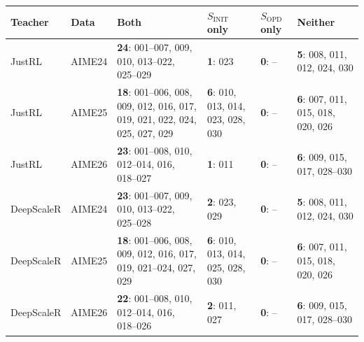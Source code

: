 \begin{center}
\label{tab:appendix_coverage_sets}
\centering
\scriptsize
\setlength{\tabcolsep}{2.2pt}
\begin{tabular}{llp{}p{}p{}p{}}
\toprule
Teacher & Data & Both & $S_{\mathrm{INIT}}$ only & $S_{\mathrm{OPD}}$ only & Neither \\
\midrule
JustRL & AIME24
& \textbf{24}: 001--007, 009, 010, 013--022, 025--029
& \textbf{1}: 023 & \textbf{0}: --
& \textbf{5}: 008, 011, 012, 024, 030 \\
JustRL & AIME25
& \textbf{18}: 001--006, 008, 009, 012, 016, 017, 019, 021, 022, 024, 025, 027, 029
& \textbf{6}: 010, 013, 014, 023, 028, 030 & \textbf{0}: --
& \textbf{6}: 007, 011, 015, 018, 020, 026 \\
JustRL & AIME26
& \textbf{23}: 001--008, 010, 012--014, 016, 018--027
& \textbf{1}: 011 & \textbf{0}: --
& \textbf{6}: 009, 015, 017, 028--030 \\
\midrule
DeepScaleR & AIME24
& \textbf{23}: 001--007, 009, 010, 013--022, 025--028
& \textbf{2}: 023, 029 & \textbf{0}: --
& \textbf{5}: 008, 011, 012, 024, 030 \\
DeepScaleR & AIME25
& \textbf{18}: 001--006, 008, 009, 012, 016, 017, 019, 021--024, 027, 029
& \textbf{6}: 010, 013, 014, 025, 028, 030 & \textbf{0}: --
& \textbf{6}: 007, 011, 015, 018, 020, 026 \\
DeepScaleR & AIME26
& \textbf{22}: 001--008, 010, 012--014, 016, 018--026
& \textbf{2}: 011, 027 & \textbf{0}: --
& \textbf{6}: 009, 015, 017, 028--030 \\
\bottomrule
\end{tabular}
\end{center}

